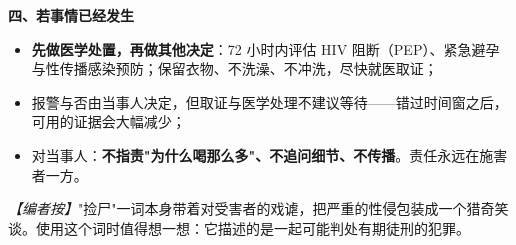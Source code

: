 \textbf{四、若事情已经发生}
\begin{itemize}
\item \textbf{先做医学处置，再做其他决定}：72 小时内评估 HIV 阻断（PEP）、紧急避孕与性传播感染预防；保留衣物、不洗澡、不冲洗，尽快就医取证；
\item 报警与否由当事人决定，但取证与医学处理不建议等待——错过时间窗之后，可用的证据会大幅减少；
\item 对当事人：\textbf{不指责"为什么喝那么多"、不追问细节、不传播}。责任永远在施害者一方。
\end{itemize}

\noindent\textit{【编者按】}"捡尸"一词本身带着对受害者的戏谑，把严重的性侵包装成一个猎奇笑谈。使用这个词时值得想一想：它描述的是一起可能判处有期徒刑的犯罪。
